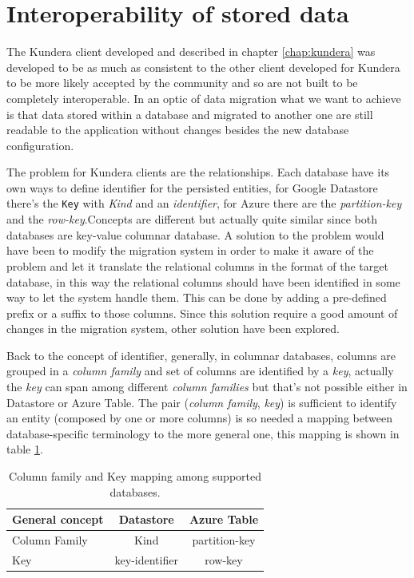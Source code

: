 \section{Interoperability of stored data}
The Kundera client developed and described in chapter \ref{chap:kundera} was developed to be as much as consistent to the other client developed for Kundera to be more likely accepted by the community and so are not built to be completely interoperable.
In an optic of data migration what we want to achieve is that data stored within a database and migrated to another one are still readable to the application without changes besides the new database configuration. 

\noindent The problem for Kundera clients are the relationships. Each database have its own ways to define identifier for the persisted entities, for Google Datastore there's the \texttt{Key} with \textit{Kind} and an \textit{identifier}, for Azure there are the \textit{partition-key} and the \textit{row-key}.Concepts are different but actually quite similar since both databases are key-value columnar database. 
A solution to the problem would have been to modify the migration system in order to make it aware of the problem and let it translate the relational columns in the format of the target database, in this way the relational columns should have been identified in some way to let the system handle them. This can be done by adding a pre-defined prefix or a suffix to those columns.
Since this solution require a good amount of changes in the migration system, other solution have been explored.
 
\newparagraph Back to the concept of identifier, generally, in columnar databases, columns are grouped in a \textit{column family} and set of columns are identified by a \textit{key}, actually the \textit{key} can span among different \textit{column families} but that's not possible either in Datastore or Azure Table.
The pair (\textit{column family}, \textit{key}) is sufficient to identify an entity (composed by one or more columns) is so needed a mapping between database-specific terminology to the more general one, this mapping is shown in table \ref{table:mapping}.

\begin{table}[h]
\begin{center}
\renewcommand{\arraystretch}{1.4}
\begin{tabular}{lcc}
\hline
\textbf{General concept} & \textbf{Datastore} & \textbf{Azure Table}\\ 
\hline\hline
Column Family & Kind & partition-key \\
Key & key-identifier & row-key \\
\hline
\end{tabular}
\end{center}
\caption{Column family and Key mapping among supported databases.}
\label{table:mapping}
\end{table}

